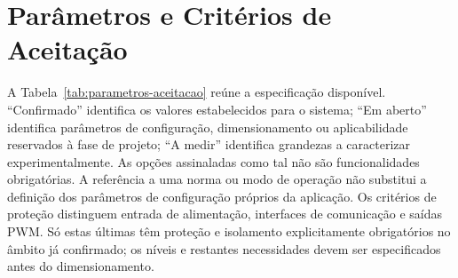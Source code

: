 \endgroup

\section{Parâmetros e Critérios de Aceitação}
\label{sec:parametros-aceitacao}

A Tabela~\ref{tab:parametros-aceitacao} reúne a especificação disponível.
\enquote{Confirmado} identifica os valores estabelecidos para o sistema;
\enquote{Em aberto} identifica parâmetros de configuração, dimensionamento
ou aplicabilidade reservados à fase de projeto; \enquote{A medir}
identifica grandezas a caracterizar experimentalmente. As opções
assinaladas como tal não são funcionalidades obrigatórias. A referência
a uma norma ou modo de operação não substitui a definição dos parâmetros
de configuração próprios da aplicação. Os critérios de proteção distinguem entrada de alimentação,
interfaces de comunicação e saídas PWM. Só estas últimas têm proteção e
isolamento explicitamente obrigatórios no âmbito já confirmado; os níveis e restantes
necessidades devem ser especificados antes do dimensionamento.

